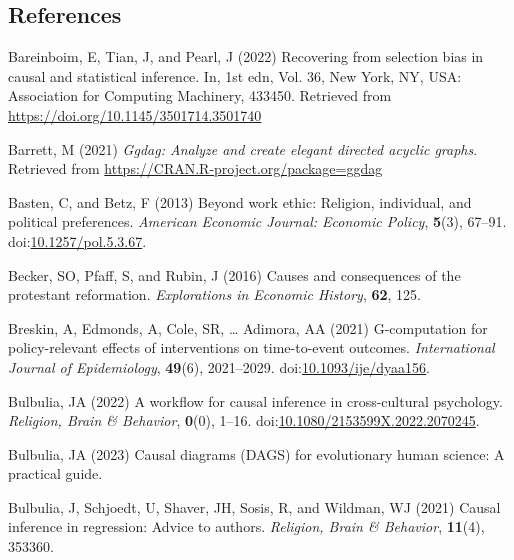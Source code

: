 \documentclass[
  singlecolumn,
  9pt]{article}
\newlength{\cslentryspacing}
\begin{document}
\subsection{References}\label{references}

\label{refs}
\setlength{\cslentryspacing}{0em}
\begin{CSLReferences}
Bareinboim, E, Tian, J, and Pearl, J (2022) Recovering from selection
bias in causal and statistical inference. In, 1st edn, Vol. 36, New
York, NY, USA: Association for Computing Machinery, 433450. Retrieved
from \url{https://doi.org/10.1145/3501714.3501740}

Barrett, M (2021) \emph{Ggdag: Analyze and create elegant directed
acyclic graphs}. Retrieved from
\url{https://CRAN.R-project.org/package=ggdag}

Basten, C, and Betz, F (2013) Beyond work ethic: Religion, individual,
and political preferences. \emph{American Economic Journal: Economic
Policy}, \textbf{5}(3), 67--91.
doi:\href{https://doi.org/10.1257/pol.5.3.67}{10.1257/pol.5.3.67}.

Becker, SO, Pfaff, S, and Rubin, J (2016) Causes and consequences of the
protestant reformation. \emph{Explorations in Economic History},
\textbf{62}, 125.

Breskin, A, Edmonds, A, Cole, SR, \ldots{} Adimora, AA (2021)
G-computation for policy-relevant effects of interventions on
time-to-event outcomes. \emph{International Journal of Epidemiology},
\textbf{49}(6), 2021--2029.
doi:\href{https://doi.org/10.1093/ije/dyaa156}{10.1093/ije/dyaa156}.

Bulbulia, JA (2022) A workflow for causal inference in cross-cultural
psychology. \emph{Religion, Brain \& Behavior}, \textbf{0}(0), 1--16.
doi:\href{https://doi.org/10.1080/2153599X.2022.2070245}{10.1080/2153599X.2022.2070245}.

Bulbulia, JA (2023) Causal diagrams (DAGS) for evolutionary human
science: A practical guide.

Bulbulia, J, Schjoedt, U, Shaver, JH, Sosis, R, and Wildman, WJ (2021)
Causal inference in regression: Advice to authors. \emph{Religion, Brain
\& Behavior}, \textbf{11}(4), 353360.


\end{CSLReferences}
\end{document}
